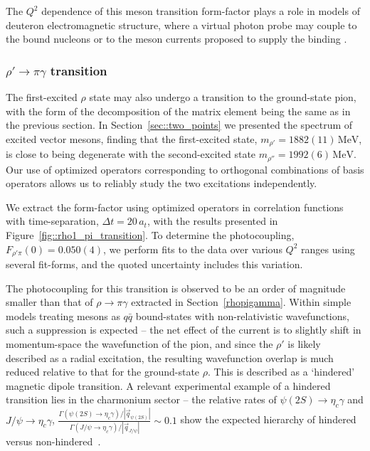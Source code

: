 \documentclass[twocolumn,amsmath,amssymb,prd,10pt,floatfix, 
superscriptaddress,nofootinbib, showpacs, preprintnumbers]{revtex4-1}
\begin{document}
The $Q^2$ dependence of this meson transition form-factor plays a role in models of deuteron electromagnetic structure, where a virtual photon probe may couple to the bound nucleons or to the meson currents proposed to supply the binding \cite{Arnold:1979cg}.




\subsubsection{$\rho'\rightarrow\pi\gamma$ transition}


The first-excited $\rho$ state may also undergo a transition to the ground-state pion, with the form of the decomposition of the matrix element being the same as in the previous section. In Section~\ref{sec::two_points} we presented the spectrum of excited vector mesons, finding that the first-excited state, $m_{\rho'} = 1882(11) \,\mathrm{MeV}$, is close to being degenerate with the second-excited state $m_{\rho''} = 1992(6) \,\mathrm{MeV}$. Our use of optimized operators corresponding to orthogonal combinations of basis operators allows us to reliably study the two excitations independently. 

We extract the form-factor using optimized operators in correlation functions with time-separation, $\Delta t = 20 \,a_t$, with the results presented in Figure~\ref{fig::rho1_pi_transition}. To determine the photocoupling, $F_{\rho' \pi}(0) = 0.050(4)$, we perform fits to the data over various $Q^2$ ranges using several fit-forms, and the quoted uncertainty includes this variation.

The photocoupling for this transition is observed to be an order of magnitude smaller than that of $\rho \to \pi \gamma$ extracted in Section~\ref{rhopigamma}. Within simple models treating mesons as $q\bar{q}$ bound-states with non-relativistic wavefunctions, such a suppression is expected -- the net effect of the current is to slightly shift in momentum-space the wavefunction of the pion, and since the $\rho'$ is likely described as a radial excitation, the resulting wavefunction overlap is much reduced relative to that for the ground-state $\rho$. This is described as a `hindered' magnetic dipole transition. A relevant experimental example of a hindered transition lies in the charmonium sector -- the relative rates of $\psi(2S) \to \eta_c \gamma$ and $J/\psi \to \eta_c \gamma$, $\frac{\Gamma(\psi(2S) \to \eta_c \gamma)/|\vec{q}_{\psi(2S)}|}{\Gamma(J/\psi \to \eta_c \gamma)/|\vec{q}_{J/\psi}|} \sim 0.1$ show the expected hierarchy of hindered versus non-hindered~\cite{PDG-2012}.
\end{document}
